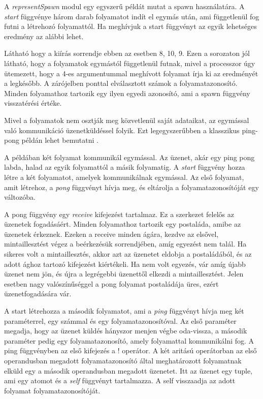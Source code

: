 A \textit{representSpawn} modul egy egyszerű példát mutat a spawn használatára. A \textit{start} függvénye három darab folyamatot indít el egymás után, ami függetlenül fog futni a létrehozó folyamattól. Ha meghívjuk a start függvényt az egyik lehetséges eredmény az alábbi lehet.



Látható hogy a kiírás sorrendje ebben az esetben 8, 10, 9. Ezen a sorozaton jól látható, hogy a folyamatok egymástól függetlenül futnak, mivel a processzor úgy ütemezett, hogy a 4-es argumentummal meghívott folyamat írja ki az eredményét a legkésőbb. A zárójelben ponttal elválasztott számok a folyamatazonosító. Minden folyamathoz tartozik egy ilyen egyedi azonosító, ami a spawn függvény visszatérési értéke.

Mivel a folyamatok nem osztják meg közvetlenül saját adataikat, az egymással való kommunikáció üzenetküldéssel folyik. Ezt legegyszerűbben a klasszikus ping-pong példán lehet bemutatni \cite{RefMan}.



A példában két folyamat kommunikál egymással. Az üzenet, akár egy ping pong labda, halad az egyik folyamattól a másik folyamatig. A \textit{start} függvény hozza létre a két folyamatot, amelyek kommunikálnak egymással. Az első folyamat, amit létrehoz, a \textit{pong} függvényt hívja meg, és eltárolja a folyamatazonosítóját egy változóba.

A pong függvény egy \textit{receive} kifejezést tartalmaz. Ez a szerkezet felelős az üzenetek fogadásáért. Minden folyamathoz tartozik egy postaláda, amibe az üzenetek érkeznek. Ezeken a receive minden ágára, kezdve az elsővel, mintaillesztést végez a beérkezésük sorrendjében, amíg egyezést nem talál. Ha sikeres volt a mintaillesztés, akkor azt az üzenetet eldobja a postaládából, és az adott ághoz tartozó kifejezést kiértékeli. Ha nem volt egyezés, vár amíg újabb üzenet nem jön, és újra a legrégebbi üzenettől elkezdi a mintaillesztést. Jelen esetben nagy valószínűséggel a pong folyamat postaládája üres, ezért üzenetfogadására vár.

A start létrehozza a második folyamatot, ami a \textit{ping} függvényt hívja meg két paraméterrel, egy számmal és egy folyamatazonosítóval. Az első paraméter megadja, hogy az üzenet küldés hányszor menjen végbe oda-vissza, a második paraméter pedig egy folyamatazonosító, amely folyamattal kommunikálni fog. A ping függvényben az első kifejezés a ! operátor. A két aritású operátorban az első operandusban megadott folyamatazonosító által meghatározott folyamatnak elküld egy a második operandusban megadott üzenetet. Itt az üzenet egy tuple, ami egy atomot és a \textit{self} függvényt tartalmazza. A self visszaadja az adott folyamat folyamatazonosítóját.

